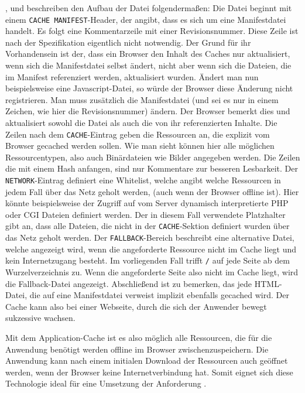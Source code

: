 \cite{W3C2012}, \cite{html5upandrunningchapter8} und \cite{Bidelman2010} beschreiben den Aufbau der Datei folgendermaßen: Die Datei beginnt mit einem \texttt{CACHE MANIFEST}-Header, der angibt, dass es sich um eine Manifestdatei handelt. Es folgt eine Kommentarzeile mit einer Revisionsnummer. Diese Zeile ist nach der Spezifikation eigentlich nicht notwendig. Der Grund für ihr Vorhandensein ist der, dass ein Browser den Inhalt des Caches nur aktualisiert, wenn sich die Manifestdatei selbst ändert, nicht aber wenn sich die Dateien, die im Manifest referenziert werden, aktualisiert wurden. Ändert man nun beispielsweise eine Javascript-Datei, so würde der Browser diese Änderung nicht registrieren. Man muss zusätzlich die Manifestdatei (und sei es nur in einem Zeichen, wie hier die Revisionsnummer) ändern. Der Browser bemerkt dies und aktualisiert sowohl die Datei als auch die von ihr referenzierten Inhalte. Die Zeilen nach dem \texttt{CACHE}-Eintrag geben die Ressourcen an, die explizit vom Browser gecached werden sollen. Wie man sieht können hier alle möglichen Ressourcentypen, also auch Binärdateien wie Bilder angegeben werden. Die Zeilen die mit einem Hash anfangen, sind nur Kommentare zur besseren Lesbarkeit. Der \texttt{NETWORK}-Eintrag definiert eine Whitelist, welche angibt welche Ressourcen in jedem Fall über das Netz geholt werden, (auch wenn der Browser offline ist). Hier könnte beispielsweise der Zugriff auf vom Server dynamisch interpretierte PHP oder CGI Dateien definiert werden. Der in diesem Fall verwendete Platzhalter gibt an, dass alle Dateien, die nicht in der \texttt{CACHE}-Sektion definiert wurden über das Netz geholt werden. Der \texttt{FALLBACK}-Bereich beschreibt eine alternative Datei, welche angezeigt wird, wenn die angeforderte Ressource nicht im Cache liegt und kein Internetzugang besteht. Im vorliegenden Fall trifft \texttt{/} auf jede Seite ab dem Wurzelverzeichnis zu. Wenn die angeforderte Seite also nicht im Cache liegt, wird die Fallback-Datei angezeigt. Abschließend ist zu bemerken, das jede HTML-Datei, die auf eine Manifestdatei verweist implizit ebenfalls gecached wird. Der Cache kann also bei einer Webseite, durch die sich der Anwender bewegt sukzessive wachsen.

Mit dem Application-Cache ist es also möglich alle Ressourcen, die für die Anwendung benötigt werden offline im Browser zwischenzuspeichern. Die Anwendung kann nach einem initialen Download der Ressourcen auch geöffnet werden, wenn der Browser keine Internetverbindung hat. Somit eignet sich diese Technologie ideal für eine Umsetzung der Anforderung .

